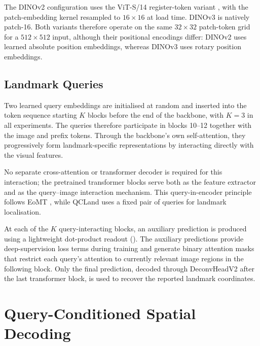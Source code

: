 The DINOv2 configuration uses the ViT-S/14 register-token variant
\parencite{darcet2024registers}, with the patch-embedding kernel
resampled to $16 \times 16$ at load time. DINOv3 is natively
patch-16. Both variants therefore operate on the same
$32 \times 32$ patch-token grid for a $512 \times 512$ input,
although their positional encodings differ: DINOv2 uses learned
absolute position embeddings, whereas DINOv3 uses rotary position
embeddings.


\subsection{Landmark Queries}
\label{sec:method-landmark-queries}

Two learned query embeddings are initialised at random and inserted
into the token sequence starting $K$ blocks before the end of the
backbone, with $K=3$ in all experiments. The queries therefore
participate in blocks 10--12 together with the image and prefix
tokens. Through the backbone's own self-attention, they progressively
form landmark-specific representations by interacting directly with
the visual features.

No separate cross-attention or transformer decoder is required for
this interaction; the pretrained transformer blocks serve both as the
feature extractor and as the query--image interaction mechanism. This
query-in-encoder principle follows EoMT
\parencite{kerssies2025eomt}, while QCLand uses a fixed pair of
queries for landmark localisation.

At each of the $K$ query-interacting blocks, an auxiliary prediction
is produced using a lightweight dot-product readout
(). The auxiliary predictions provide
deep-supervision loss terms during training and generate binary
attention masks that restrict each query's attention to currently
relevant image regions in the following block. Only the final
prediction, decoded through DeconvHeadV2 after the last transformer
block, is used to recover the reported landmark coordinates.



\section{Query-Conditioned Spatial Decoding}
\label{sec:method-decoder}


